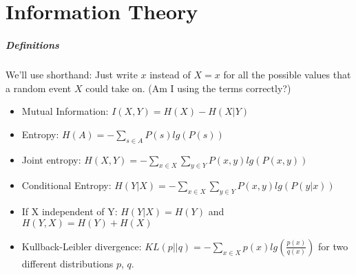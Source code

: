 \documentclass[11pt]{article}
\begin{document}
\section{Information Theory}
\subparagraph{Definitions}
We'll use shorthand: Just write $x$ instead of $X= x$ for all the possible values that a random event $X$ could take on. (Am I using the terms correctly?)
\begin{itemize}
\item Mutual Information: $I(X,Y) = H(X) - H(X|Y)$
\item Entropy: $H(A) = - \sum_{s \in A} P(s) lg(P(s))$
\item Joint entropy: $H(X, Y) = - \sum_{x \in X} \sum_{y \in Y} P(x,y) lg(P(x,y))$
\item Conditional Entropy: $H(Y|X) = -\sum_{x \in X} \sum_{y \in Y} P(x,y) lg(P(y|x))$
\item If X independent of Y: $H(Y|X) = H(Y)$ and $H(Y,X) = H(Y) +H(X)$
\item Kullback-Leibler divergence: $KL(p||q) = - \sum_{x \in X} p(x) lg(\frac{p(x)}{q(x)})$ for two different distributions $p$, $q$.
\end{itemize}
\end{document}

